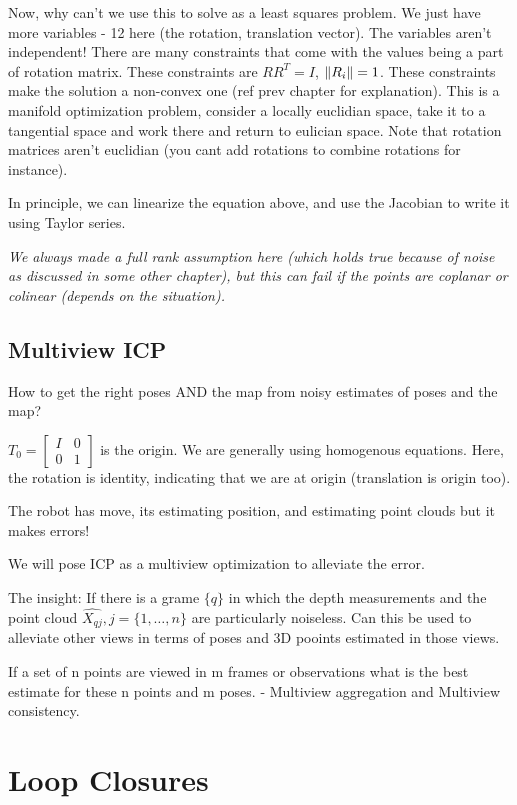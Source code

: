 Now, why can't we use this to solve as a least squares problem. We just have more variables - 12 here (the rotation, translation vector). The variables aren't independent! There are many constraints that come with the values being a part of rotation matrix. These constraints are $RR^T=I$, $\left\lVert R_i\right\rVert=1$. These constraints make the solution a non-convex one (ref prev chapter for explanation). This is a manifold optimization problem, consider a locally euclidian space, take it to a tangential space and work there and return to eulician space. Note that rotation matrices aren't euclidian (you cant add rotations to combine rotations for instance). 

In principle, we can linearize the equation above, and use the Jacobian to write it using Taylor series. 

\textit{We always made a full rank assumption here (which holds true because of noise as discussed in some other chapter), but this can fail if the points are coplanar or colinear (depends on the situation).}

\subsection{Multiview ICP}

How to get the right poses AND the map from noisy estimates of poses and the map? 

$T_0 = \begin{bmatrix}I & 0 \\ 0 & 1\end{bmatrix}$ is the origin. We are generally using homogenous equations. Here, the rotation is identity, indicating that we are at origin (translation is origin too). 

The robot has move, its estimating position, and estimating point clouds but it makes errors!

We will pose ICP as a multiview optimization to alleviate the error.

The insight: If there is a grame $\{q\}$ in which the depth measurements and the point cloud $\hat{X_{qj}}, j=\{1,\hdots,n\}$ are particularly noiseless. Can this be used to alleviate other views in terms of poses and 3D pooints estimated in those views. 

If a set of n points are viewed in m frames or observations what is the best estimate for these n points and m poses. - Multiview aggregation and Multiview consistency.

\section{Loop Closures}

